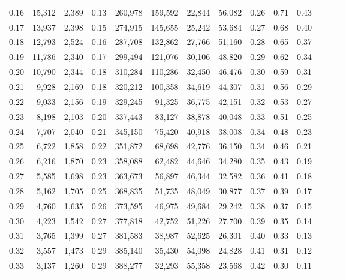 \begin{tabular}{rrrrrrrrrrrrrr}
0.16 &  15,312 &  2,389 &  0.13 &  260,978 &  159,592 &  22,844 &  56,082 &  0.26 &  0.71 &      0.43 \\
0.17 &  13,937 &  2,398 &  0.15 &  274,915 &  145,655 &  25,242 &  53,684 &  0.27 &  0.68 &      0.40 \\
0.18 &  12,793 &  2,524 &  0.16 &  287,708 &  132,862 &  27,766 &  51,160 &  0.28 &  0.65 &      0.37 \\
0.19 &  11,786 &  2,340 &  0.17 &  299,494 &  121,076 &  30,106 &  48,820 &  0.29 &  0.62 &      0.34 \\
0.20 &  10,790 &  2,344 &  0.18 &  310,284 &  110,286 &  32,450 &  46,476 &  0.30 &  0.59 &      0.31 \\
0.21 &   9,928 &  2,169 &  0.18 &  320,212 &  100,358 &  34,619 &  44,307 &  0.31 &  0.56 &      0.29 \\
0.22 &   9,033 &  2,156 &  0.19 &  329,245 &   91,325 &  36,775 &  42,151 &  0.32 &  0.53 &      0.27 \\
0.23 &   8,198 &  2,103 &  0.20 &  337,443 &   83,127 &  38,878 &  40,048 &  0.33 &  0.51 &      0.25 \\
0.24 &   7,707 &  2,040 &  0.21 &  345,150 &   75,420 &  40,918 &  38,008 &  0.34 &  0.48 &      0.23 \\
0.25 &   6,722 &  1,858 &  0.22 &  351,872 &   68,698 &  42,776 &  36,150 &  0.34 &  0.46 &      0.21 \\
0.26 &   6,216 &  1,870 &  0.23 &  358,088 &   62,482 &  44,646 &  34,280 &  0.35 &  0.43 &      0.19 \\
0.27 &   5,585 &  1,698 &  0.23 &  363,673 &   56,897 &  46,344 &  32,582 &  0.36 &  0.41 &      0.18 \\
0.28 &   5,162 &  1,705 &  0.25 &  368,835 &   51,735 &  48,049 &  30,877 &  0.37 &  0.39 &      0.17 \\
0.29 &   4,760 &  1,635 &  0.26 &  373,595 &   46,975 &  49,684 &  29,242 &  0.38 &  0.37 &      0.15 \\
0.30 &   4,223 &  1,542 &  0.27 &  377,818 &   42,752 &  51,226 &  27,700 &  0.39 &  0.35 &      0.14 \\
0.31 &   3,765 &  1,399 &  0.27 &  381,583 &   38,987 &  52,625 &  26,301 &  0.40 &  0.33 &      0.13 \\
0.32 &   3,557 &  1,473 &  0.29 &  385,140 &   35,430 &  54,098 &  24,828 &  0.41 &  0.31 &      0.12 \\
0.33 &   3,137 &  1,260 &  0.29 &  388,277 &   32,293 &  55,358 &  23,568 &  0.42 &  0.30 &      0.11 \\

\end{tabular}
